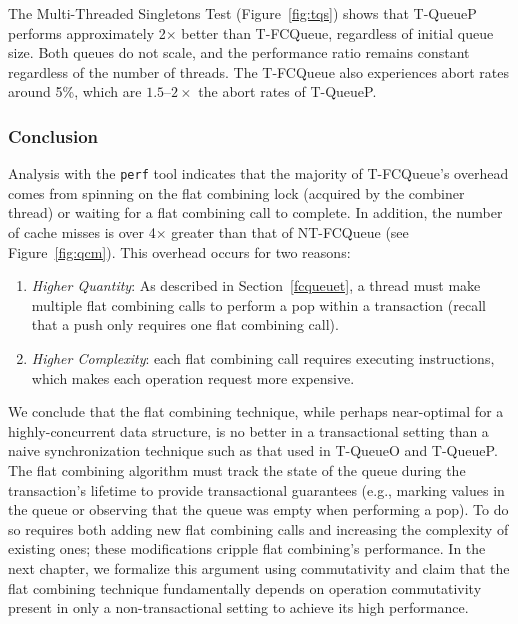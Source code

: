 The Multi-Threaded Singletons Test (Figure~\ref{fig:tqs}) shows that T-QueueP performs approximately 2$\times$ better than T-FCQueue, regardless of initial queue size. Both queues do not scale, and the performance ratio remains constant regardless of the number of threads. The T-FCQueue also experiences abort rates around 5\%, which are $1.5$--$2\times$ the abort rates of T-QueueP.

\vspace{12pt}
\noindent{}

\subsubsection{Conclusion}
Analysis with the \texttt{perf} tool indicates that the majority of T-FCQueue's overhead comes from spinning on the flat combining lock (acquired by the combiner thread) or waiting for a flat combining call to complete. In addition, the number of cache misses is over 4$\times$ greater than that of NT-FCQueue (see Figure~\ref{fig:qcm}). This overhead occurs for two reasons:
\begin{enumerate}
    \item \emph{Higher Quantity}: As described in Section~\ref{fcqueuet}, a thread must make multiple flat combining calls to perform a pop within a transaction (recall that a push only requires one flat combining call).
\item \emph{Higher Complexity}: each flat combining call requires executing instructions, which makes each operation request more expensive.
\end{enumerate}

We conclude that the flat combining technique, while perhaps near-optimal for a highly-concurrent data structure, is no better in a transactional setting than a naive synchronization technique such as that used in T-QueueO and T-QueueP. The flat combining algorithm must track the state of the queue during the transaction's lifetime to provide transactional guarantees (e.g., marking values in the queue or observing that the queue was empty when performing a pop). To do so requires both adding new flat combining calls and increasing the complexity of existing ones; these modifications cripple flat combining's performance.
In the next chapter, we formalize this argument using commutativity and claim that the flat combining technique fundamentally depends on operation commutativity present in only a non-transactional setting to achieve its high performance. 

